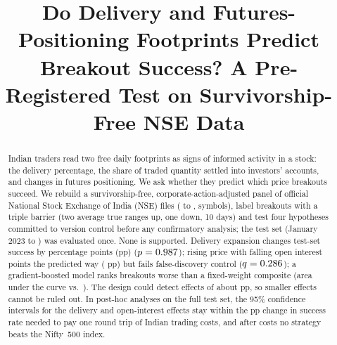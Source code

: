 \documentclass[conference]{IEEEtran}
\begin{document}
\title{Do Delivery and Futures-Positioning Footprints Predict Breakout Success? A Pre-Registered Test on Survivorship-Free NSE Data}

\author{
\and
{}
\and
{}
\and
{}
}

\maketitle

\begin{abstract}
Indian traders read two free daily footprints as signs of informed activity in a stock: the delivery
percentage, the share of traded quantity settled into investors' accounts, and changes in futures positioning.
We ask whether they predict which price breakouts succeed. We rebuild a survivorship-free,
corporate-action-adjusted panel of official National Stock Exchange of India (NSE) files (\DataStart{} to
\DataEnd, \NSymbols{} symbols), label breakouts with a triple barrier (two average true ranges up, one down,
10 days) and test four hypotheses committed to version control before any confirmatory analysis; the test set
(January 2023 to \DataEnd) was evaluated once. None is supported. Delivery expansion changes test-set success
by \HOneDiff{} percentage points (pp) ($p=0.987$); rising price with falling open interest points the
predicted way (\HTwoDiff{} pp) but fails false-discovery control ($q=0.286$); a gradient-boosted model
ranks breakouts worse than a fixed-weight composite (area under the curve \AUCxgb{} vs.\ \AUCcomp). The
design could detect effects of about \MDEHOne{} pp, so smaller effects cannot be ruled out. In post-hoc
analyses on the full test set, the 95\% confidence intervals for the delivery and open-interest effects stay
within the \BreakEven{} pp change in success rate needed to pay one round trip of Indian trading costs, and
after costs no strategy beats the Nifty~500 index.
\end{abstract}
\end{document}
